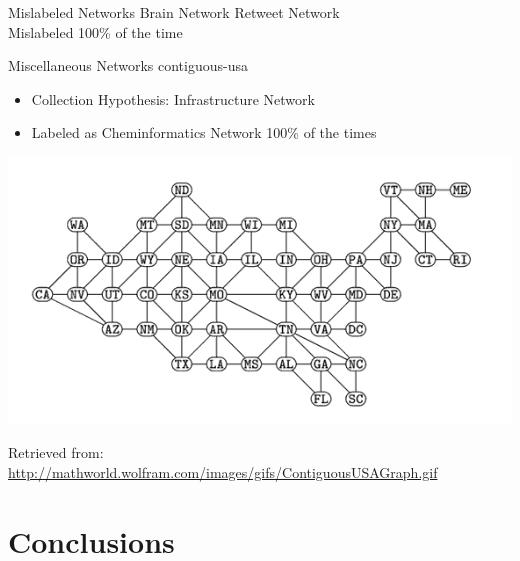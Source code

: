 \documentclass{beamer}
\begin{document}
\begin{frame}{Mislabeled Networks}
\pause \footnotesize{\hspace{1cm}Brain Network \hspace{3cm} Retweet Network}\\
\pause \footnotesize Mislabeled 100\% of the time

\end{frame}



\begin{frame}{Miscellaneous Networks}
    contiguous-usa\\
    \begin{itemize}
    \item Collection Hypothesis: Infrastructure Network
    \item Labeled as Cheminformatics Network 100\% of the times\\
    \end{itemize}
    \centering
    \includegraphics[scale=0.5]{contiguous-usa-graph}
    
    \tiny Retrieved from:  \url{http://mathworld.wolfram.com/images/gifs/ContiguousUSAGraph.gif}
    
\end{frame}


\section{Conclusions}
\end{document}
